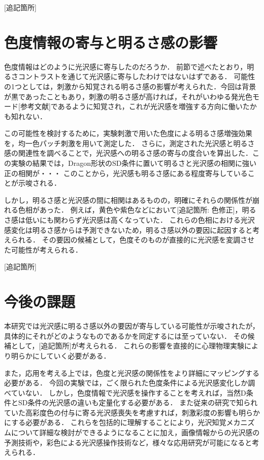         [追記箇所]

    \section{色度情報の寄与と明るさ感の影響}
        色度情報はどのように光沢感に寄与したのだろうか．
        前節で述べたとおり，明るさコントラストを通じて光沢感に寄与したわけではないはずである．
        可能性の1つとしては，刺激から知覚される明るさ感の影響が考えられた．今回は背景が黒であったこともあり，刺激の明るさ感が高ければ，それがいわゆる発光色モード[参考文献]であるように知覚され，これが光沢感を増強する方向に働いたかも知れない．
        
        この可能性を検討するために，実験刺激で用いた色度による明るさ感増強効果を，均一色パッチ刺激を用いて測定した．
        さらに，測定された光沢感と明るさ感の関連性を調べることで，光沢感への明るさ感の寄与の度合いを算出した．この実験の結果では，Dragon形状のSD条件に置いて明るさと光沢感の相関に強い正の相関が・・・
        このことから，光沢感も明るさ感にある程度寄与していることが示唆される．

        しかし，明るさ感と光沢感の間に相関はあるものの，明確にそれらの関係性が崩れる色相があった．
        例えば，黄色や紫色などにおいて[追記箇所: 色修正]，明るさ感は低いにも関わらず光沢感は高くなっていた．
        これらの色相における光沢感変化は明るさ感からは予測できないため，明るさ感以外の要因に起因すると考えられる．
        その要因の候補として，色度そのものが直接的に光沢感を変調させた可能性が考えられる．

        [追記箇所]

    \section{今後の課題}
        本研究では光沢感に明るさ感以外の要因が寄与している可能性が示唆されたが，具体的にそれがどのようなものであるかを同定するには至っていない．
        その候補として，[追記箇所]が考えられる．
        これらの影響を直接的に心理物理実験により明らかにしていく必要がある．

        また，応用を考える上では，色度と光沢感の関係性をより詳細にマッピングする必要がある．
        今回の実験では，ごく限られた色度条件による光沢感変化しか調べていない．
        しかし，色度情報で光沢感を操作することを考えれば，当然D条件とSD条件の光沢感の違いも定量化する必要がある．
        また従来の研究で知られていた高彩度色の付与に寄る光沢感喪失\cite{Nishida}を考慮すれば，刺激彩度の影響も明らかにする必要がある．
        これらを包括的に理解することにより，光沢知覚メカニズムについて詳細な検討ができるようになることに加え，画像情報からの光沢感の予測技術や，彩色による光沢感操作技術など，様々な応用研究が可能になると考えられる．


    \newpage